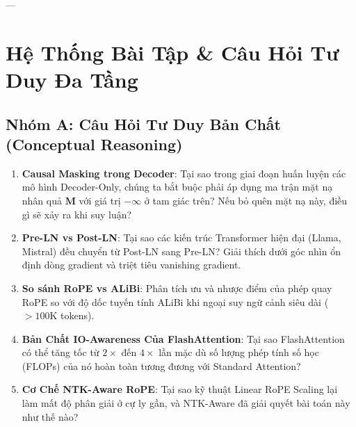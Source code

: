 ---

\section{Hệ Thống Bài Tập \& Câu Hỏi Tư Duy Đa Tầng}
\label{sec:ch06-exercises}

\subsection{Nhóm A: Câu Hỏi Tư Duy Bản Chất (Conceptual Reasoning)}
\begin{enumerate}
  \item \textbf{Causal Masking trong Decoder}: Tại sao trong giai đoạn huấn luyện các mô hình Decoder-Only, chúng ta bắt buộc phải áp dụng ma trận mặt nạ nhân quả $\mathbf{M}$ với giá trị $-\infty$ ở tam giác trên? Nếu bỏ quên mặt nạ này, điều gì sẽ xảy ra khi suy luận?
  \item \textbf{Pre-LN vs Post-LN}: Tại sao các kiến trúc Transformer hiện đại (Llama, Mistral) đều chuyển từ Post-LN sang Pre-LN? Giải thích dưới góc nhìn ổn định dòng gradient và triệt tiêu vanishing gradient.
  \item \textbf{So sánh RoPE vs ALiBi}: Phân tích ưu và nhược điểm của phép quay RoPE so với độ dốc tuyến tính ALiBi khi ngoại suy ngữ cảnh siêu dài ($> 100\text{K}$ tokens).
  \item \textbf{Bản Chất IO-Awareness Của FlashAttention}: Tại sao FlashAttention có thể tăng tốc từ $2\times$ đến $4\times$ lần mặc dù số lượng phép tính số học (FLOPs) của nó hoàn toàn tương đương với Standard Attention?
  \item \textbf{Cơ Chế NTK-Aware RoPE}: Tại sao kỹ thuật Linear RoPE Scaling lại làm mất độ phân giải ở cự ly gần, và NTK-Aware đã giải quyết bài toán này như thế nào?
\end{enumerate}


